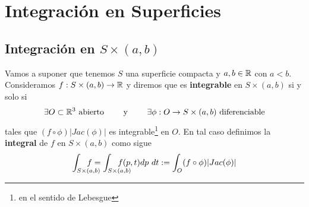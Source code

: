 \section{Integración en Superficies}

\subsection{Integración en $S\times(a,b)$}

\begin{definicion}
    Vamos a suponer que tenemos $S$ una superficie compacta y $a,b\in \mathbb{R}$ con $a<b$. Consideramos $f:S\times (a,b)\to \mathbb{R}$ y diremos que es \textbf{integrable} en $S\times (a,b)$ si y solo si
    \begin{gather*}
        \exists O \subset \mathbb{R}^3 \text{ abierto} \qquad \text{ y } \qquad \exists \phi : O \to S\times (a,b) \text{ diferenciable}
    \end{gather*}
    tales que $(f \circ \phi)|Jac(\phi)|$ es integrable\footnote{en el sentido de Lebesgue} en $O$. En tal caso definimos la \textbf{integral} de $f$ en $S\times(a,b)$ como sigue
    \begin{gather*}
        \int_{\mathrlap{S\times(a,b)}} \quad f = \int_{\mathrlap{S\times(a,b)}}\quad f(p,t) dp\ dt := \int_O (f\circ \phi) |Jac(\phi)|
    \end{gather*}
\end{definicion}

